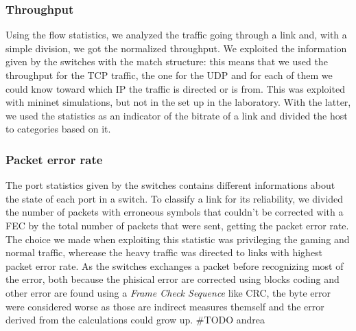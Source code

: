 \documentclass[conference,10pt]{IEEEtran}
\begin{document}
  \subsubsection{Throughput}
	Using the flow statistics, we analyzed the traffic going through a link and, with a simple division, we got the normalized throughput.
	We exploited the information given by the switches with the match structure: this means that we used the throughput for the TCP traffic,
	the one for the UDP and for each of them we could know toward which IP the traffic is directed or is from. This was exploited with mininet
	simulations, but not in the set up in the laboratory. With the latter, we used the statistics as an indicator of the bitrate of a link
	and divided the host to categories based on it.
\\
\subsubsection{Packet error rate}
The port statistics given by the switches contains different informations about the state of each port in a switch. To classify a link for its
reliability, we divided the number of packets with erroneous symbols that couldn't be corrected with a FEC by the total number of packets that were sent,
getting the packet error rate. The choice we made when exploiting this statistic was privileging the gaming and normal traffic, wherease the
heavy traffic was directed to links with highest packet error rate.  As the switches exchanges a packet before recognizing most of the error, both because the
phisical error are corrected using blocks coding and other error are found using a \textit{Frame Check Sequence} like CRC, the byte error were considered worse as
those are indirect measures themself and the error derived from the calculations could grow up.
\#TODO andrea
\\
\end{document}
